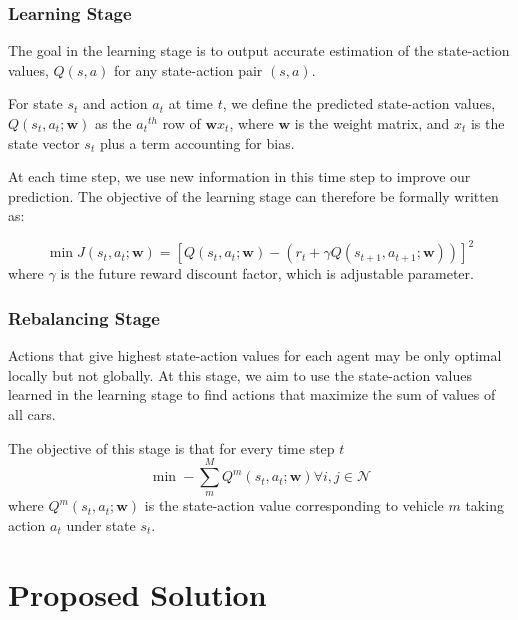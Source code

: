 \documentclass[letterpaper, 10 pt, conference]{ieeeconf}  %
\begin{document}
\subsubsection{Learning Stage}
The goal in the learning stage is to output accurate estimation of the state-action values, $Q(s,a)$ for any state-action pair $(s,a)$.

For state $s_t$ and action $a_t$ at time $t$, we define the predicted state-action values, $Q(s_t,a_t;\textbf{w})$ as the ${a_t}^{th}$ row of $\textbf{w}x_t$,
where $\textbf{w}$ is the weight matrix, and $x_t$ is the state vector $s_t$ plus a term accounting for bias. 

At each time step, we use new information in this time step to improve our prediction. The objective of the learning stage can therefore be formally written as:

\begin{equation}
    \min J(s_t,a_t;\textbf{w}) = [Q(s_t,a_t;\textbf{w}) - (r_t+\gamma  Q(s_{t+1},a_{t+1};\textbf{w}))]^2
\end{equation}
where $\gamma$ is the future reward discount factor, which is adjustable parameter.\\


\subsubsection{Rebalancing Stage}
Actions that give highest state-action values for each agent may be only optimal locally but not globally. At this stage, we aim to use the state-action values learned in the learning stage to find actions that maximize the sum of values of all cars. 

The objective of this stage is that for every time step $t$
\begin{equation}
        \min -\sum_m^M Q^m(s_t,a_t;\textbf{w})\forall i,j\in \mathcal{N}
\end{equation}
where $Q^m(s_t,a_t;\textbf{w})$ is the state-action value corresponding to vehicle $m$ taking action $a_t$ under state $s_t$. 

\section{Proposed Solution}
\end{document}
